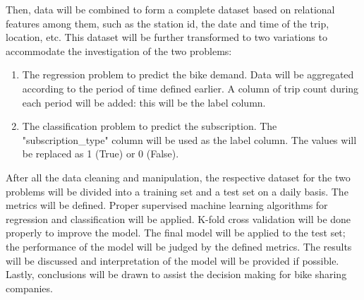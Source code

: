 \documentclass[a4paper]{article}
\begin{document}
	Then, data will be combined to form a complete dataset based on relational features among them, such as the station id, the date and time of the trip, location, etc. This dataset will be further transformed to two variations to accommodate the investigation of the two problems:
	
	\begin{enumerate}
		\item The regression problem to predict the bike demand. Data will be aggregated according to the period of time defined earlier. A column of trip count during each period will be added: this will be the label column. 
		\item The classification problem to predict the subscription. The "subscription\_type" column will be used as the label column. The values will be replaced as 1 (True) or 0 (False).
	\end{enumerate}
		
	After all the data cleaning and manipulation, the respective dataset for the two problems will be divided into a training set and a test set on a daily basis. The metrics will be defined. Proper supervised machine learning algorithms for regression and classification will be applied. K-fold cross validation will be done properly to improve the model. The final model will be applied to the test set; the performance of the model will be judged by the defined metrics. The results will be discussed and interpretation of the model will be provided if possible. Lastly, conclusions will be drawn to assist the decision making for bike sharing companies.
\end{document}
